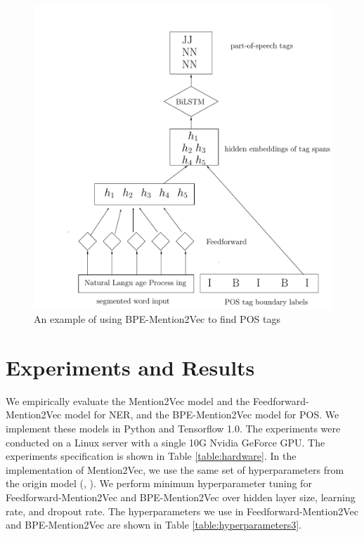 \begin{figure}
  \centering
  \includegraphics[scale=0.6]{bpemention2vec.pdf}
 \caption{An example of using BPE-Mention2Vec to find POS tags}
  \label{fig:bpemention2vec}
\end{figure}

\section{Experiments and Results}

We empirically evaluate the Mention2Vec model and the Feedforward-Mention2Vec model for NER, and the BPE-Mention2Vec model for POS. We implement these models in Python and Tensorflow 1.0. The experiments were conducted on a Linux server with a single 10G Nvidia GeForce GPU. The experiments specification is shown in Table \ref{table:hardware}. In the implementation of Mention2Vec, we use the same set of hyperparameters from the origin model (\citeauthor{stratos2016mention2vec}, \citeyear{stratos2016mention2vec}). We perform minimum hyperparameter tuning for Feedforward-Mention2Vec and BPE-Mention2Vec over hidden layer size, learning rate, and dropout rate. The hyperparameters we use in Feedforward-Mention2Vec and BPE-Mention2Vec are shown in Table \ref{table:hyperparameters3}.

